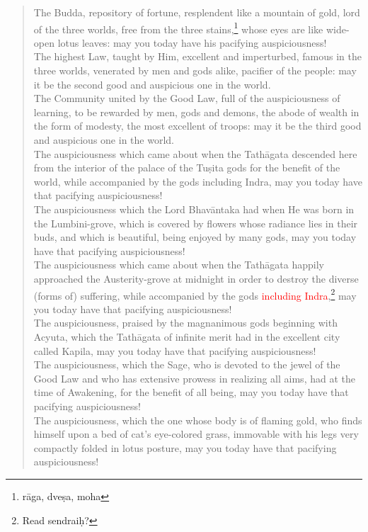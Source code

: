 \documentclass[11pt]{book}
\newcommand{\red}[1]{\textcolor{red}{#1}}
\begin{document}
\begin{verse}
The Budda, repository of fortune, resplendent like a mountain of gold, lord of the three worlds, free from the three stains,\footnote{rāga, dveṣa, moha} whose eyes are like wide-open lotus leaves: may you today have his pacifying auspiciousness!\\
The highest Law, taught by Him, excellent and imperturbed, famous in the three worlds, venerated by men and gods alike, pacifier of the people: may it be  the second good and auspicious one in the world.\\
The Community united by the Good Law, full of the auspiciousness of learning, to be rewarded by men, gods and demons, the abode of wealth in the form of modesty, the most excellent of troops: may it be the third good and auspicious one in the world.\\
The auspiciousness which came about when the Tathāgata descended here from the interior of the palace of the Tuṣita gods for the benefit of the world, while accompanied by the gods including Indra, may you today have that pacifying auspiciousness!\\
The auspiciousness which the Lord Bhavāntaka had when He was born in the Lumbini-grove, which is covered by flowers whose radiance lies in their buds, and which is beautiful, being enjoyed by many gods, may you today have that pacifying auspiciousness!\\
The auspiciousness which came about when the Tathāgata happily approached the Austerity-grove at midnight in order to destroy the diverse (forms of) suffering, while accompanied by the gods \red{including Indra},\footnote{Read sendraiḥ?} may you today have that pacifying auspiciousness!\\
The auspiciousness, praised by the magnanimous gods beginning with Acyuta, which the Tathāgata of infinite merit had in the excellent city called Kapila, may you today have that pacifying auspiciousness!\\
The auspiciousness, which the Sage, who is devoted to the jewel of the Good Law and who has extensive prowess in realizing all aims, had at the time of Awakening, for the benefit of all being, may you today have that pacifying auspiciousness!\\
The auspiciousness, which the one whose body is of flaming gold, who finds himself upon a bed of cat's eye-colored grass, immovable with his legs very compactly folded in lotus posture, may you today have that pacifying auspiciousness!\\

\end{verse}
\end{document}
